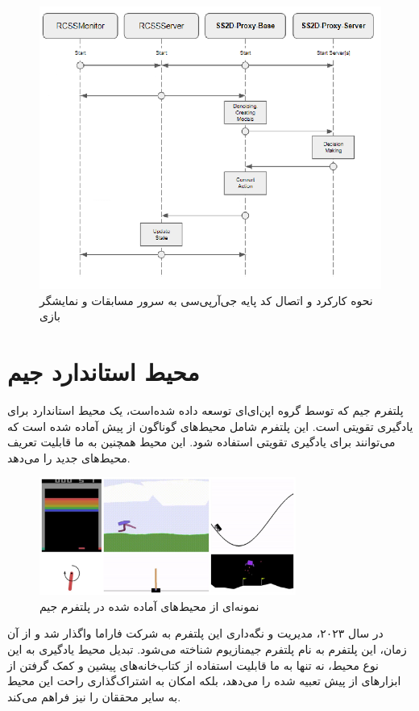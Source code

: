 \begin{figure}[H]
    \centering
    \includegraphics[width=1\textwidth]{images/grpc_base.png}
    \caption{نحوه کارکرد و اتصال کد پایه جی‌آر‌پی‌سی به سرور مسابقات و نمایشگر بازی}\label{fig:grpc_base}
    
\end{figure}
\section{محیط استاندارد جیم}
پلتفرم جیم 
که توسط گروه اپن‌ای‌ای 
توسعه داده شده‌است،
یک محیط استاندارد برای یادگیری تقویتی است.
این پلتفرم شامل محیط‌های گوناگون از پیش آماده شده است که می‌توانند برای یادگیری تقویتی استفاده شود.
این محیط همچنین به ما قابلیت تعریف محیط‌های جدید را می‌دهد.
\begin{figure}
    \centering
    \includegraphics[width=0.75\textwidth]{images/openaigym.jpg}
    \caption{نمونه‌ای از محیط‌های آماده شده در پلتفرم جیم}\label{fig:gym}
    
\end{figure}
در سال ۲۰۲۳، 
مدیریت و نگه‌داری این پلتفرم به شرکت فاراما 
واگذار شد و از آن زمان، این پلتفرم به نام پلتفرم جیمنازیوم 
 شناخته می‌شود.
تبدیل محیط یادگیری به این نوع محیط، نه تنها به ما قابلیت استفاده از کتاب‌خانه‌های پیشین و کمک گرفتن از ابزار‌های
از پیش تعبیه شده را می‌دهد، بلکه امکان به اشتراک‌گذاری راحت این محیط به سایر محققان را نیز فراهم می‌کند.
